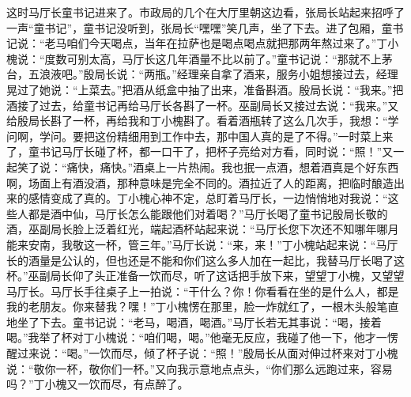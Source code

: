 \documentclass[12pt,oneside]{book}
\begin{document}
这时马厅长童书记进来了。市政局的几个在大厅里朝这边看，张局长站起来招呼了一声``童书记''，童书记没听到，张局长``嘿嘿''笑几声，坐了下去。进了包厢，童书记说：``老马咱们今天喝点，当年在拉萨也是喝点喝点就把那两年熬过来了。''丁小槐说：``度数可别太高，马厅长这几年酒量不比以前了。''童书记说：``那就不上茅台，五浪液吧。''殷局长说：``两瓶。''经理亲自拿了酒来，服务小姐想接过去，经理晃过了她说：``上菜去。''把酒从纸盒中抽了出来，准备斟酒。殷局长说：``我来。''把酒接了过去，给童书记再给马厅长各斟了一杯。巫副局长又接过去说：``我来。''又给殷局长斟了一杯，再给我和丁小槐斟了。看着酒瓶转了这么几次手，我想：``学问啊，学问。要把这份精细用到工作中去，那中国人真的是了不得。''一时菜上来了，童书记马厅长碰了杯，都一口干了，把杯子亮给对方看，同时说：``照！''又一起笑了说：``痛快，痛快。''酒桌上一片热闹。我也抿一点酒，想着酒真是个好东西啊，场面上有酒没酒，那种意味是完全不同的。酒拉近了人的距离，把临时酿造出来的感情变成了真的。丁小槐心神不定，总盯着马厅长，一边悄悄地对我说：``这些人都是酒中仙，马厅长怎么能跟他们对着喝？''马厅长喝了童书记殷局长敬的酒，巫副局长脸上泛着红光，端起酒杯站起来说：``马厅长您下次还不知哪年哪月能来安南，我敬这一杯，管三年。''马厅长说：``来，来！''丁小槐站起来说：``马厅长的酒量是公认的，但也还是不能和你们这么多人加在一起比，我替马厅长喝了这杯。''巫副局长仰了头正准备一饮而尽，听了这话把手放下来，望望丁小槐，又望望马厅长。马厅长手往桌子上一拍说：``干什么？你！你看看在坐的是什么人，都是我的老朋友。你来替我？嘿！''丁小槐愣在那里，脸一炸就红了，一根木头般笔直地坐了下去。童书记说：``老马，喝酒，喝酒。''马厅长若无其事说：``喝，接着喝。''我举了杯对丁小槐说：``咱们喝，喝。''他毫无反应，我碰了他一下，他才一愣醒过来说：``喝。''一饮而尽，倾了杯子说：``照！''殷局长从面对伸过杯来对丁小槐说：``敬你一杯，敬你们一杯。''又向我示意地点点头，``你们那么远跑过来，容易吗？''丁小槐又一饮而尽，有点醉了。
\end{document}
